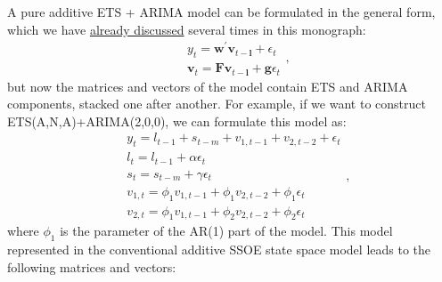 \documentclass[]{book}
\theoremstyle{definition}
\theoremstyle{definition}
\theoremstyle{definition}
\theoremstyle{definition}
\theoremstyle{remark}
\begin{document}
A pure additive ETS + ARIMA model can be formulated in the general form, which we have \protect\hyperlink{ADAMETSPureAdditive}{already discussed} several times in this monograph:
\begin{equation*}
  \begin{aligned}
    &{y}_{t} = \mathbf{w}^\prime \mathbf{v}_{t-\mathbf{l}} + \epsilon_t \\
    &\mathbf{v}_{t} = \mathbf{F} \mathbf{v}_{t-\mathbf{l}} + \mathbf{g} \epsilon_t
  \end{aligned},
\end{equation*}
but now the matrices and vectors of the model contain ETS and ARIMA components, stacked one after another. For example, if we want to construct ETS(A,N,A)+ARIMA(2,0,0), we can formulate this model as:
\begin{equation}
  \begin{aligned}
    &{y}_{t} = l_{t-1} + s_{t-m} + v_{1,t-1} + v_{2,t-2} + \epsilon_t \\
    &l_t = l_{t-1} + \alpha \epsilon_t \\
    &s_t = s_{t-m} + \gamma \epsilon_t \\
    &v_{1,t} = \phi_1 v_{1,t-1} + \phi_1 v_{2,t-2} + \phi_1 \epsilon_t \\
    &v_{2,t} = \phi_1 v_{1,t-1} + \phi_2 v_{2,t-2} + \phi_2 \epsilon_t 
  \end{aligned},
  \label{eq:ADAMETSARIMAANA100}
\end{equation}
where \(\phi_1\) is the parameter of the AR(1) part of the model. This model represented in the conventional additive SSOE state space model leads to the following matrices and vectors:
\end{document}
